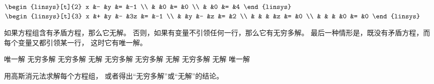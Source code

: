 \begin{exercises}
\begin{exparts*}
        \(\begin{linsys}[t]{2}
              x &- &y    &= &-1  \\
                &  &0     &= &0 \\          
                 &  &0    &= &4            
        \end{linsys}\)
      \partsitem 
        \(\begin{linsys}[t]{3}
              x &+ &y  &- &3z  &= &-1  \\
                &  &y  &- &z  &= &2  \\
                &  &  &  &z    &= &0  \\
                &  &  &  &0   &= &0  
        \end{linsys}\)
    \end{exparts*}
    \begin{answer}
      如果方程组含有矛盾方程，那么它无解。
      否则，如果有变量不引领任何一行，那么它有无穷多解。
      最后一种情形是，既没有矛盾方程，而每个变量又都引领某一行，
      这时它有唯一解。
      \begin{exparts}
        \partsitem 唯一解
        \partsitem 无穷多解
        \partsitem 无穷多解
        \partsitem 无解
        \partsitem 无穷多解
        \partsitem 无穷多解
        \partsitem 无解
        \partsitem 无穷多解
        \partsitem 无解
        \partsitem 唯一解
      \end{exparts}
    \end{answer}
  \recommended \item  
    用高斯消元法求解每个方程组，
    或者得出“无穷多解”或“无解”的结论。
\end{exercises}
